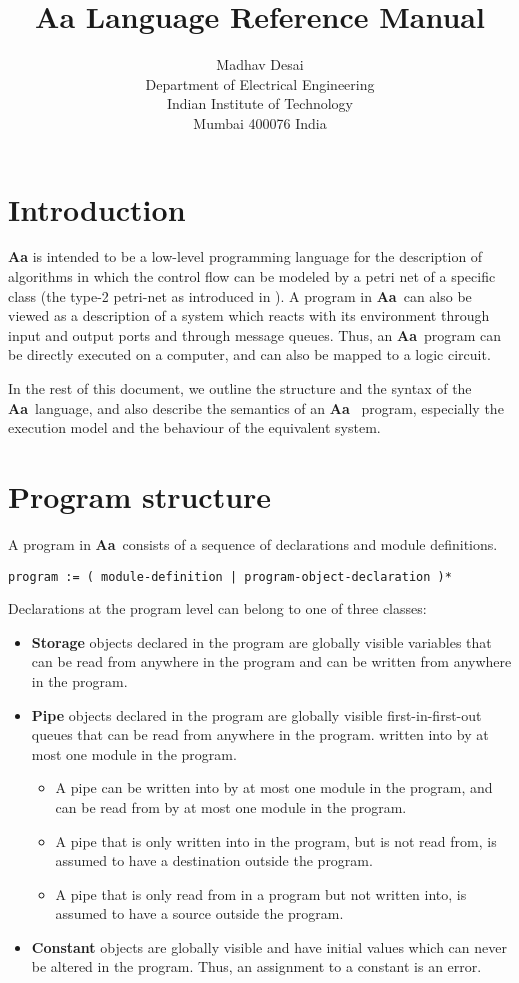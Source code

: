 \documentclass{article}
\title{Aa Language Reference Manual}
\author{Madhav Desai \\ Department of Electrical Engineering \\ Indian Institute of Technology \\
	Mumbai 400076 India}
\newcommand{\Aa}{{\bf Aa}~}
\begin{document}
\maketitle

\section{Introduction}

{\bf Aa} is intended to be a low-level 
programming language for the description
of algorithms in which the control flow
can be modeled by a petri net
of a specific class (the type-2 petri-net as
introduced in \cite{ref:SameerPhD}).  A program in
\Aa can also be viewed as a 
description of a system which reacts with 
its environment through input and output ports and 
through message queues.  Thus, an \Aa program
can be directly executed on a computer, and
can also be mapped to a logic circuit.

In the rest of this document, we outline the
structure and the syntax of the \Aa language,
and also describe the semantics of an \Aa
program, especially the execution model and
the behaviour of the equivalent system.


\section{Program structure}


A program in \Aa consists of a sequence of
declarations and module definitions.  
\begin{verbatim}
program := ( module-definition | program-object-declaration )*
\end{verbatim}
Declarations at the program level 
can belong to one of three classes:
\begin{itemize}
\item {\bf Storage} objects declared in the program
are globally visible variables that can be read from
anywhere in the program and can be written from anywhere
in the program.
\item {\bf Pipe} objects declared in the program are
globally visible first-in-first-out queues that can 
be read from anywhere in the program. 
written into by at most one module in the program.
\begin{itemize}
\item A pipe can be written into by at most one module
in the program, and can be read from by at most one module
in the program.
\item A pipe that is only written into in the program, but
is not read from, is assumed to have a destination outside
the program.
\item A pipe that is only read from in a program but not
written into, is assumed to have a source outside the program.
\end{itemize}
\item {\bf Constant} objects are globally visible and have
initial values which can never be altered in the program.
Thus, an assignment to a constant is an error.
\end{itemize} 
\end{document}
